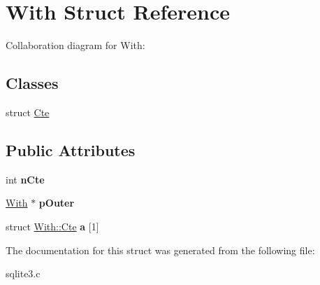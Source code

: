 \hypertarget{structWith}{}\section{With Struct Reference}
\label{structWith}


Collaboration diagram for With\+:
\subsection*{Classes}
\begin{DoxyCompactItemize}
\item 
struct \hyperlink{structWith_1_1Cte}{Cte}
\end{DoxyCompactItemize}
\subsection*{Public Attributes}
\begin{DoxyCompactItemize}
\item 
int {\bfseries n\+Cte}\hypertarget{structWith_a42f5ecda008d1671bb317b8219f5a6ed}{}\label{structWith_a42f5ecda008d1671bb317b8219f5a6ed}

\item 
\hyperlink{structWith}{With} $\ast$ {\bfseries p\+Outer}\hypertarget{structWith_ab86b3af65b4e3d4c0b1ee04ffa50e1d9}{}\label{structWith_ab86b3af65b4e3d4c0b1ee04ffa50e1d9}

\item 
struct \hyperlink{structWith_1_1Cte}{With\+::\+Cte} {\bfseries a} \mbox{[}1\mbox{]}\hypertarget{structWith_a9c68a725bc482cbcc65132a4b7b8aaf2}{}\label{structWith_a9c68a725bc482cbcc65132a4b7b8aaf2}

\end{DoxyCompactItemize}


The documentation for this struct was generated from the following file\+:\begin{DoxyCompactItemize}
\item 
sqlite3.\+c\end{DoxyCompactItemize}
